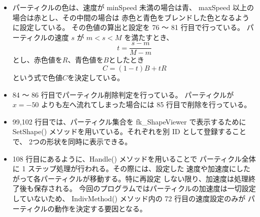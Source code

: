 \begin{itemize}
 \item パーティクルの色は、速度が minSpeed 未満の場合は青、
	maxSpeed 以上の場合は赤とし、その中間の場合は
	赤色と青色をブレンドした色となるように設定している。
	その色値の算出と設定を 76 〜 81 行目で行っている。
	パーティクルの速度 \(s\) が \(m < s < M\) を満たすとき、
	\begin{equation}
		t = \frac{s - m}{M - m}
	\end{equation}
	とし、赤色値を\(R\)、青色値を\(B\)としたとき
	\begin{equation}
		 C = (1-t)B + tR
	\end{equation}
	という式で色値\(C\)を決定している。

 \item 84 〜 86 行目でパーティクル削除判定を行っている。
	パーティクルが \(x = -50\) よりも左へ流れてしまった場合には
	85 行目で削除を行っている。

 \item 99,102 行目では、パーティクル集合を fk\_ShapeViewer で表示するために
	SetShape() メソッドを用いている。それぞれを別 ID として登録することで、
	2つの形状を同時に表示できる。

 \item 108 行目にあるように、Handle() メソッドを用いることで
	パーティクル全体に 1 ステップ処理が行われる。その際には、設定した
	速度や加速度にしたがって各パーティクルが移動する。特に再設定
	しない限り、加速度は処理終了後も保存される。
	今回のプログラムではパーティクルの加速度は一切設定していないため、
	IndivMethod() メソッド内の 72 行目の速度設定のみが
	パーティクルの動作を決定する要因となる。

\end{itemize}
